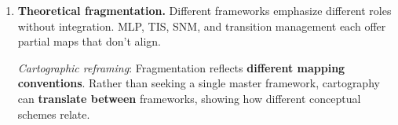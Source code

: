 \documentclass[../main.tex]{subfiles}
\begin{document}
\begin{enumerate}[leftmargin=*, itemsep=0.8em]
\emph{Cartographic reframing}: Multimodal cartography \textbf{integrates} rather than chooses. Theory guides what features to map; multiple data sources triangulate positions; qualitative insight interprets quantitative patterns.

\item \textbf{Theoretical fragmentation.} Different frameworks emphasize different roles without integration. MLP, TIS, SNM, and transition management each offer partial maps that don't align.

\emph{Cartographic reframing}: Fragmentation reflects \textbf{different mapping conventions}. Rather than seeking a single master framework, cartography can \textbf{translate between} frameworks, showing how different conceptual schemes relate.

\end{enumerate}
\end{document}
